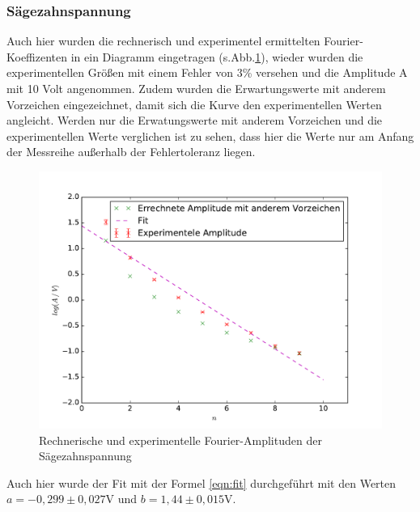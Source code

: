 \subsubsection{Sägezahnspannung}
Auch hier wurden die rechnerisch und experimentel ermittelten Fourier-Koeffizenten in
ein Diagramm eingetragen (s.Abb.\ref{fig:dp}), wieder wurden
die experimentellen Größen mit einem Fehler von 3\% versehen und die Amplitude A mit 10 Volt
angenommen.
Zudem wurden die Erwartungswerte mit anderem Vorzeichen eingezeichnet, damit sich die
 Kurve den experimentellen Werten angleicht.
Werden nur die Erwatungswerte mit anderem Vorzeichen und die experimentellen Werte verglichen
 ist zu sehen, dass hier die Werte nur am Anfang der Messreihe außerhalb der Fehlertoleranz liegen.
\begin{figure}
  \centering
  \includegraphics[width= \textwidth]{Plots/Dreieckplot.pdf}
  \caption{Rechnerische und experimentelle Fourier-Amplituden der Sägezahnspannung}
  \label{fig:dp}
\end{figure}
\FloatBarrier
Auch hier wurde der Fit mit der Formel \eqref{eqn:fit} durchgeführt mit den Werten
$a = -0,299 \pm 0,027 $V und $ b = 1,44 \pm 0,015 $V.
